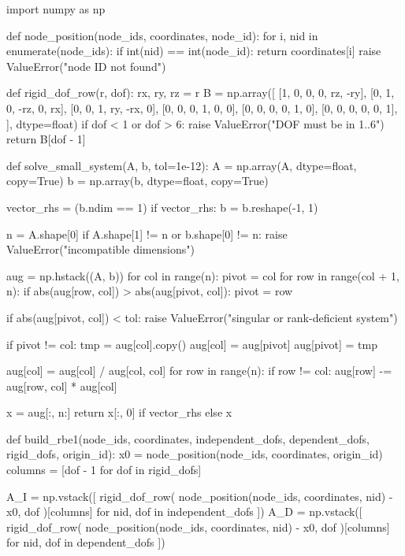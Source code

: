 \begin{python}
import numpy as np


def node_position(node_ids, coordinates, node_id):
    for i, nid in enumerate(node_ids):
        if int(nid) == int(node_id):
            return coordinates[i]
    raise ValueError("node ID not found")


def rigid_dof_row(r, dof):
    rx, ry, rz = r
    B = np.array([
        [1, 0, 0,   0,  rz, -ry],
        [0, 1, 0, -rz,   0,  rx],
        [0, 0, 1,  ry, -rx,   0],
        [0, 0, 0,   1,   0,   0],
        [0, 0, 0,   0,   1,   0],
        [0, 0, 0,   0,   0,   1],
    ], dtype=float)
    if dof < 1 or dof > 6:
        raise ValueError("DOF must be in 1..6")
    return B[dof - 1]


def solve_small_system(A, b, tol=1e-12):
    A = np.array(A, dtype=float, copy=True)
    b = np.array(b, dtype=float, copy=True)

    vector_rhs = (b.ndim == 1)
    if vector_rhs:
        b = b.reshape(-1, 1)

    n = A.shape[0]
    if A.shape[1] != n or b.shape[0] != n:
        raise ValueError("incompatible dimensions")

    aug = np.hstack((A, b))
    for col in range(n):
        pivot = col
        for row in range(col + 1, n):
            if abs(aug[row, col]) > abs(aug[pivot, col]):
                pivot = row

        if abs(aug[pivot, col]) < tol:
            raise ValueError("singular or rank-deficient system")

        if pivot != col:
            tmp = aug[col].copy()
            aug[col] = aug[pivot]
            aug[pivot] = tmp

        aug[col] = aug[col] / aug[col, col]
        for row in range(n):
            if row != col:
                aug[row] -= aug[row, col] * aug[col]

    x = aug[:, n:]
    return x[:, 0] if vector_rhs else x


def build_rbe1(node_ids, coordinates, independent_dofs,
               dependent_dofs, rigid_dofs, origin_id):
    x0 = node_position(node_ids, coordinates, origin_id)
    columns = [dof - 1 for dof in rigid_dofs]

    A_I = np.vstack([
        rigid_dof_row(
            node_position(node_ids, coordinates, nid) - x0, dof
        )[columns]
        for nid, dof in independent_dofs
    ])
    A_D = np.vstack([
        rigid_dof_row(
            node_position(node_ids, coordinates, nid) - x0, dof
        )[columns]
        for nid, dof in dependent_dofs
    ])


\end{python}
